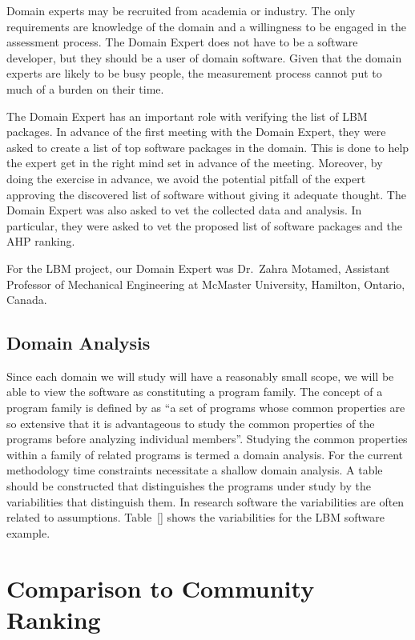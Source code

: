 \documentclass[runningheads]{llncs}
\begin{document}
Domain experts may be recruited from academia or industry.  The only
requirements are knowledge of the domain and a willingness to be engaged in the
assessment process.  The Domain Expert does not have to be a software developer,
but they should be a user of domain software.  Given that the domain experts are
likely to be busy people, the measurement process cannot put to much of a burden
on their time.

The Domain Expert has an important role with verifying the list of LBM packages.
In advance of the first meeting with the Domain Expert, they were asked to
create a list of top software packages in the domain.  This is done to help the
expert get in the right mind set in advance of the meeting.  Moreover, by doing
the exercise in advance, we avoid the potential pitfall of the expert approving
the discovered list of software without giving it adequate thought.  The Domain
Expert was also asked to vet the collected data and analysis.  In particular,
they were asked to vet the proposed list of software packages and the AHP
ranking.

For the LBM project, our Domain Expert was Dr.\
Zahra Motamed, Assistant Professor of Mechanical Engineering at McMaster
University, Hamilton, Ontario, Canada.  

\subsection{Domain Analysis} \label{SecDomainAnalysis}

Since each domain we will study will have a reasonably small scope, we will be
able to view the software as constituting a program family.  The concept of a
program family is defined by \cite{parnas1976design} as ``a set of programs
whose common properties are so extensive that it is advantageous to study the
common properties of the programs before analyzing individual members''.
Studying the common properties within a family of related programs is termed a
domain analysis.  For the current methodology time constraints necessitate a
shallow domain analysis.  A table should be constructed that distinguishes the
programs under study by the variabilities that distinguish them.  In research
software the variabilities are often related to assumptions.  Table~\ref{} shows
the variabilities for the LBM software example.

\section{Comparison to Community Ranking} \label{repmetrics}
\end{document}
